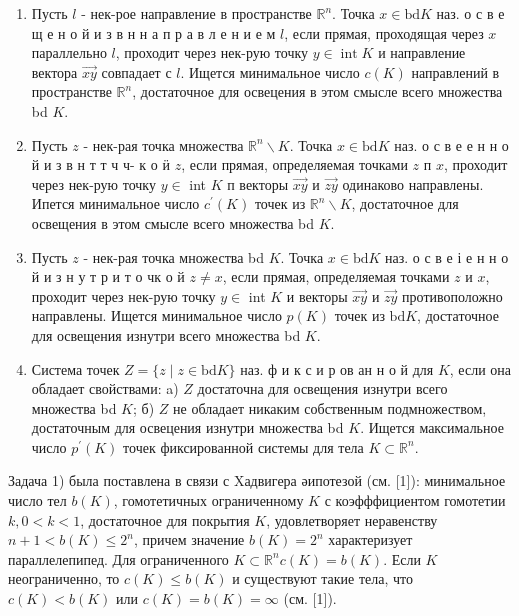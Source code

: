 \documentclass[10pt]{article}
\begin{document}
\begin{enumerate}
  \item Пусть $l$ - нек-рое направление в пространстве $\mathbb{R}^{n}$. Точка $x \in \mathrm{bd} K$ наз. о с в е щ е н о й и з в н н а п р а в л е н и е м $l$, если прямая, проходящая через $x$ параллельно $l$, проходит через нек-рую точку $y \in \operatorname{int} K$ и направление вектора $\overrightarrow{x y}$ совпадает с $l$. Ищется минимальное число $c(K)$ направлений в пространстве $\mathbb{R}^{n}$, достаточное для освецения в этом смысле всего множества bd $K$.

  \item Пусть $z$ - нек-рая точка множества $\mathbb{R}^{n} \backslash K$. Точка $x \in \mathrm{bd} K$ наз. о с в е е н н о й и з в н т т ч ч- к о ӥ $z$, если прямая, определяемая точками $z$ п $x$, проходит через нек-рую точку $y \in$ int $K$ п векторы $\overrightarrow{x y}$ и $\overrightarrow{z y}$ одинаково направлены. Ипется минимальное число $c^{\prime}(K)$ точек из $\mathbb{R}^{n} \backslash K$, достаточное для освещения в этом смысле всего множества bd $K$.

  \item Пусть $z$ - нек-рая точка множества bd $K$. Точка $x \in \mathrm{bd} K$ наз. о с в е і е н н о й и з н у т р и т о чк о й $z \neq x$, если прямая, определяемая точками $z$ и $x$, проходит через нек-рую точку $y \in$ int $K$ и векторы $\overrightarrow{x y}$ и $\overrightarrow{z y}$ противоположно направлены. Ищется минимальное число $p(K)$ точек из $\mathrm{bd} K$, достаточное для освещения изнутри всего множества bd $K$.

  \item Система точек $Z=\{z \mid z \in \mathrm{bd} K\}$ наз. ф и к с и р ов ан н о й для $K$, если она обладает свойствами: a) $Z$ достаточна для освещения изнутри всего множества bd $K$; б) $Z$ не обладает никаким собственным подмножеством, достаточным для освецения изнутри множества bd $K$. Ищется максимальное число $p^{\prime}(K)$ точек фиксированной системы для тела $K \subset \mathbb{R}^{n}$.

\end{enumerate}

Задача 1) была поставлена в связи с Xадвигера әипотезой (см. [1]): минимальное число тел $b(K)$, гомотетичных ограниченному $K$ с коэфффициентом гомотетии $k, 0<k<1$, достаточное для покрытия $K$, удовлетворяет неравенству $n+1<b(K) \leqslant 2^{n}$, причем значение $b(K)=2^{n}$ характеризует параллелепипед. Для ограниченного $K \subset \mathbb{R}^{n} c(K)=b(K)$. Если $K$ неограниченно, то $c(K) \leqslant b(K)$ и существуют такие тела, что $c(K)<b(K)$ или $c(K)=b(K)=\infty$ (см. [1]).
\end{document}
